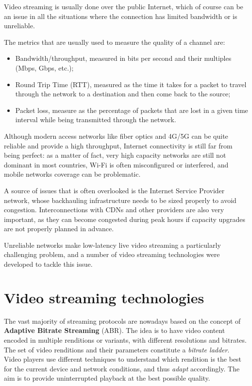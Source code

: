 Video streaming is usually done over the public Internet, which of course can be an issue in all the situations where the connection has limited bandwidth or is unreliable.

The metrics that are usually used to measure the quality of a channel are:

\begin{itemize}
    \item Bandwidth/throughput, measured in bits per second and their multiples (Mbps, Gbps, etc.);
    \item Round Trip Time (RTT), measured as the time it takes for a packet to travel through the network to a destination and then come back to the source;
    \item Packet loss, measure as the percentage of packets that are lost in a given time interval while being transmitted through the network.
\end{itemize}

Although modern access networks like fiber optics and 4G/5G can be quite reliable and provide a high throughput, Internet connectivity is still far from being perfect: as a matter of fact, very high capacity networks are still not dominant in most countries, Wi-Fi is often misconfigured or interfered, and mobile networks coverage can be problematic.


A source of issues that is often overlooked is the Internet Service Provider network, whose backhauling infrastructure needs to be sized properly to avoid congestion. Interconnections with CDNs and other providers are also very important, as they can become congested during peak hours if capacity upgrades are not properly planned in advance.

Unreliable networks make low-latency live video streaming a particularly challenging problem, and a number of video streaming technologies were developed to tackle this issue.


\section{Video streaming technologies}
\label{sec:intro/technologies}


The vast majority of streaming protocols are nowadays based on the concept of \textbf{Adaptive Bitrate Streaming} (ABR). The idea is to have video content encoded in multiple renditions or variants, with different resolutions and bitrates. The set of video renditions and their parameters constitute a \textit{bitrate ladder}. Video players use different techniques to understand which rendition is the best for the current device and network conditions, and thus \textit{adapt} accordingly. The aim is to provide uninterrupted playback at the best possible quality.

